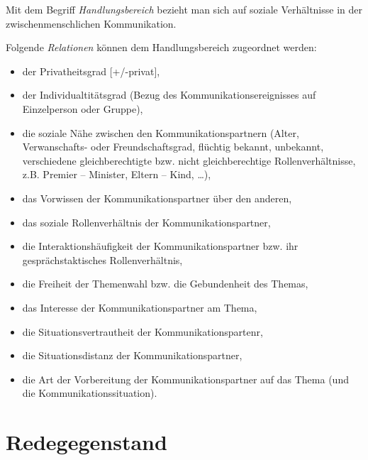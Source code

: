 \documentclass[
  letterpaper,
]{scrbook}
\providecommand{\tightlist}{%
  \setlength{\itemsep}{0pt}\setlength{\parskip}{0pt}}\usepackage{longtable,booktabs,array}
\begin{document}
Mit dem Begriff \emph{Handlungsbereich} bezieht man sich auf soziale
Verhältnisse in der zwischenmenschlichen Kommunikation.

Folgende \emph{Relationen} können dem Handlungsbereich zugeordnet
werden:

\begin{itemize}
\tightlist
\item
  der Privatheitsgrad {[}+/-privat{]},\\
\item
  der Individualtitätsgrad (Bezug des Kommunikationsereignisses auf
  Einzelperson oder Gruppe),\\
\item
  die soziale Nähe zwischen den Kommunikationspartnern (Alter,
  Verwanschafts- oder Freundschaftsgrad, flüchtig bekannt, unbekannt,
  verschiedene gleichberechtigte bzw. nicht gleichberechtige
  Rollenverhältnisse, z.B. Premier -- Minister, Eltern -- Kind,
  \ldots),\\
\item
  das Vorwissen der Kommunikationspartner über den anderen,\\
\item
  das soziale Rollenverhältnis der Kommunikationspartner,\\
\item
  die Interaktionshäufigkeit der Kommunikationspartner bzw. ihr
  gesprächstaktisches Rollenverhältnis,\\
\item
  die Freiheit der Themenwahl bzw. die Gebundenheit des Themas,\\
\item
  das Interesse der Kommunikationspartner am Thema,\\
\item
  die Situationsvertrautheit der Kommunikationspartenr,\\
\item
  die Situationsdistanz der Kommunikationspartner,\\
\item
  die Art der Vorbereitung der Kommunikationspartner auf das Thema (und
  die Kommunikationssituation).\\
\end{itemize}

\hypertarget{redegegenstand}{%
\chapter{Redegegenstand}\label{redegegenstand}}
\end{document}
